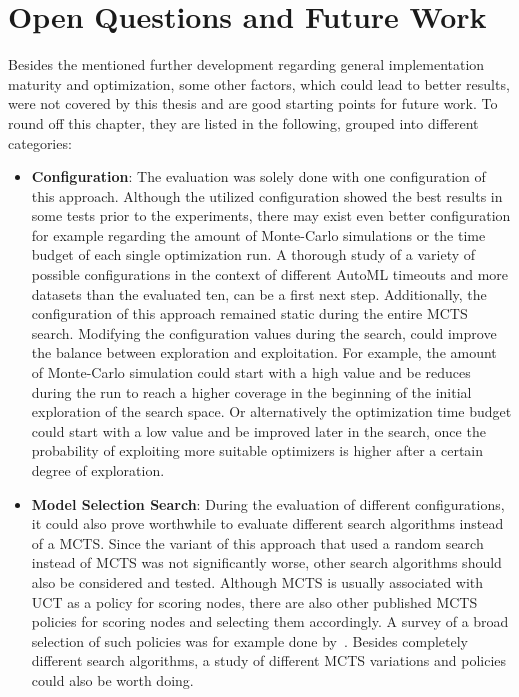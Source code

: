 \section{Open Questions and Future Work}
Besides the mentioned further development regarding general implementation maturity and optimization, some other factors, which could lead to better results, were not covered by this thesis and are good starting points for future work.
To round off this chapter, they are listed in the following, grouped into different categories:
\begin{itemize}
    \item \textbf{Configuration}: The evaluation was solely done with one configuration of this approach.
    Although the utilized configuration showed the best results in some tests prior to the experiments, there may exist even better configuration for example regarding the amount of Monte-Carlo simulations or the time budget of each single optimization run.
    A thorough study of a variety of possible configurations in the context of different AutoML timeouts and more datasets than the evaluated ten, can be a first next step.\newline
    Additionally, the configuration of this approach remained static during the entire MCTS search.
    Modifying the configuration values during the search, could improve the balance between exploration and exploitation.
    For example, the amount of Monte-Carlo simulation could start with a high value and be reduces during the run to reach a higher coverage in the beginning of the initial exploration of the search space.
    Or alternatively the optimization time budget could start with a low value and be improved later in the search, once the probability of exploiting more suitable optimizers is higher after a certain degree of exploration.
    \item \textbf{Model Selection Search}: During the evaluation of different configurations, it could also prove worthwhile to evaluate different search algorithms instead of a MCTS.
    Since the variant of this approach that used a random search instead of MCTS was not significantly worse, other search algorithms should also be considered and tested.\newline
    Although MCTS is usually associated with UCT as a policy for scoring nodes, there are also other published MCTS policies for scoring nodes and selecting them accordingly.
    A survey of a broad selection of such policies was for example done by~\textcite{Browne-Policies}.
    Besides completely different search algorithms, a study of different MCTS variations and policies could also be worth doing.

\end{itemize}
